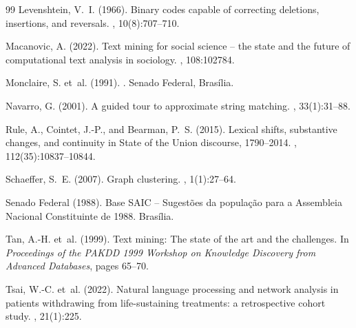 \documentclass[12pt]{article}
\begin{document}
\begin{thebibliography}{99}
Levenshtein, V.~I. (1966).
\newblock Binary codes capable of correcting deletions, insertions, and reversals.
, 10(8):707--710.

Macanovic, A. (2022).
\newblock Text mining for social science -- the state and the future of computational text analysis in sociology.
, 108:102784.

Monclaire, S. et~al. (1991).
.
\newblock Senado Federal, Brasília.

Navarro, G. (2001).
\newblock A guided tour to approximate string matching.
, 33(1):31--88.

Rule, A., Cointet, J.-P., and Bearman, P.~S. (2015).
\newblock Lexical shifts, substantive changes, and continuity in State of the Union discourse, 1790--2014.
, 112(35):10837--10844.

Schaeffer, S.~E. (2007).
\newblock Graph clustering.
, 1(1):27--64.

Senado Federal (1988).
\newblock Base SAIC -- Sugestões da população para a Assembleia Nacional Constituinte de 1988.
\newblock Brasília.

Tan, A.-H. et~al. (1999).
\newblock Text mining: The state of the art and the challenges.
\newblock In {\em Proceedings of the PAKDD 1999 Workshop on Knowledge Discovery from Advanced Databases}, pages 65--70.

Tsai, W.-C. et~al. (2022).
\newblock Natural language processing and network analysis in patients withdrawing from life-sustaining treatments: a retrospective cohort study.
, 21(1):225.

\end{thebibliography}
\end{document}

